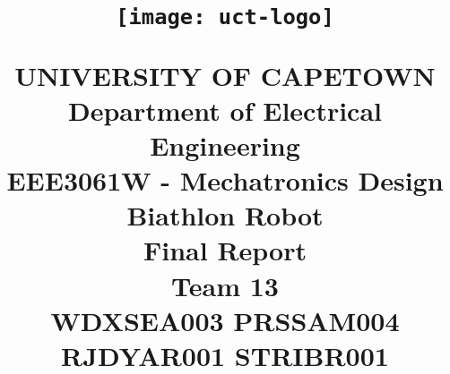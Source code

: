 
\newcommand{\hmwkTitle}{Final Report} %
\newcommand{\hmwkDueDate}{Wednesday,\ September\ 03,\ 2014}                    %
\newcommand{\hmwkClass}{EEE3061W - Mechatronics Design}                    %
\newcommand{\hmwkClassTime}{10:30am}                                 %
\newcommand{\hmwkClassInstructor}{Jones}                               %
\newcommand{\hmwkAuthorName}{Team 13}    %
\newcommand{\hmwkDepartment}{Department of Electrical Engineering}           %


\title{
\begin{figure}[H]
  \begin{center}
    \texttt{[image: uct-logo]}
  \end{center}
\end{figure}
\textmd{\Huge UNIVERSITY OF CAPETOWN \\ \LARGE \hmwkDepartment} \\
\vspace{2in}
\textmd{\textbf{\LARGE \hmwkClass \\ \Huge Biathlon Robot \\ \hmwkTitle \\ \vspace{1.5in} \Large Team 13 \\  WDXSEA003 \textbar\space PRSSAM004 \textbar\space RJDYAR001 \textbar\space STRIBR001}}\\
}

\date{}




